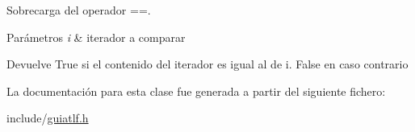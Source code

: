 Sobrecarga del operador ==. 


\begin{DoxyParams}{Parámetros}
{\em i} & iterador a comparar \\
\hline
\end{DoxyParams}
\begin{DoxyReturn}{Devuelve}
True si el contenido del iterador es igual al de i. False en caso contrario 
\end{DoxyReturn}


La documentación para esta clase fue generada a partir del siguiente fichero\+:\begin{DoxyCompactItemize}
\item 
include/\hyperlink{guiatlf_8h}{guiatlf.\+h}\end{DoxyCompactItemize}
